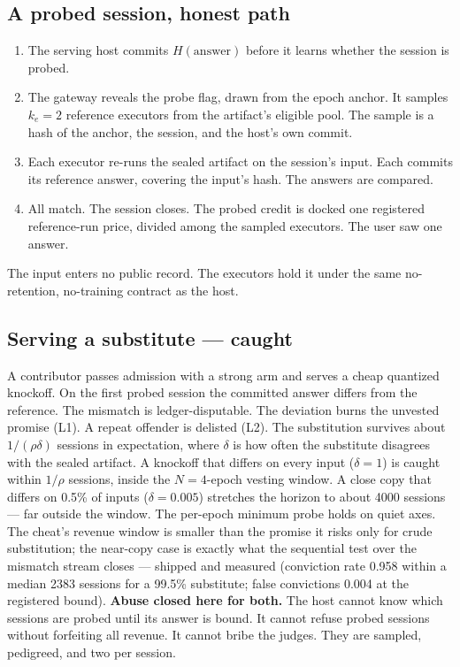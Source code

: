 \documentclass[11pt]{article}
\begin{document}
\subsection{A probed session, honest path}

\begin{enumerate}
\item The serving host commits $H(\text{answer})$ before it
learns whether the session is probed.
\item The gateway reveals the probe flag, drawn from the epoch
anchor. It samples $k_e=2$ reference executors from the
artifact's eligible pool. The sample is a hash of the anchor, the
session, and the host's own commit.
\item Each executor re-runs the sealed artifact on the session's
input. Each commits its reference answer, covering the input's
hash. The answers are compared.
\item All match. The session closes. The probed credit is docked
one registered reference-run price, divided among the sampled
executors. The user saw one answer.
\end{enumerate}
The input enters no public record. The executors hold it under
the same no-retention, no-training contract as the host.

\subsection{Serving a substitute --- caught}

A contributor passes admission with a strong arm and serves a
cheap quantized knockoff. On the first probed session the
committed answer differs from the reference. The mismatch is
ledger-disputable. The deviation burns the unvested promise (L1).
A repeat offender is delisted (L2). The substitution survives
about $1/(\rho\delta)$ sessions in expectation, where $\delta$ is
how often the substitute disagrees with the sealed artifact. A
knockoff that differs on every input ($\delta = 1$) is caught
within $1/\rho$ sessions, inside the $N=4$-epoch vesting window.
A close copy that differs on 0.5\% of inputs ($\delta = 0.005$)
stretches the horizon to about 4000 sessions --- far outside the
window. The per-epoch minimum probe holds on
quiet axes. The cheat's revenue window is smaller than the
promise it risks only for crude substitution; the near-copy case
is exactly what the sequential test over the mismatch stream
closes --- shipped and measured (conviction rate 0.958 within a
median 2383 sessions for a 99.5\% substitute; false convictions
0.004 at the registered bound). \textbf{Abuse closed
here for both.} The host cannot
know which sessions are probed until its answer is bound. It
cannot refuse probed sessions without forfeiting all revenue. It
cannot bribe the judges. They are sampled, pedigreed, and two per
session.
\end{document}
